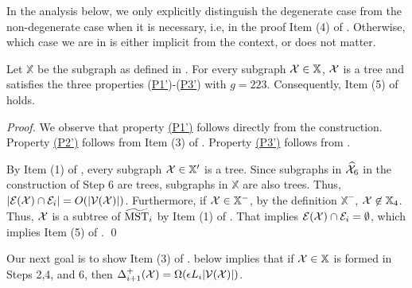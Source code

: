 In the analysis below, we only explicitly  distinguish the degenerate case from the non-degenerate case when it is necessary, i.e, in the proof Item (4) of . Otherwise, which case we are in is either implicit from the context, or does not matter.

\begin{lemma}\label{lm:XProp} Let $\mathbb{X}$ be the subgraph as defined in . For every subgraph $\mathcal{X} \in \mathbb{X}$, $\mathcal{X}$ is a tree and satisfies the three properties (\hyperlink{P1'}{P1'})-(\hyperlink{P3'}{P3'}) with $g = 223$. Consequently, Item (5) of  holds.
\end{lemma}
\begin{proof} We observe that property \hyperlink{P1'}{(P1')} follows directly from the construction.  Property \hyperlink{P2'}{(P2')} follows from Item (3) of .  Property \hyperlink{P3'}{(P3')} follows from . 
	
	By Item (1) of , every subgraph $\mathcal{X} \in \mathbb{X}'$ is a tree. Since subgraphs in $\widehat{\mathcal{X}}_6$ in the construction of Step 6 are trees, subgraphs in $\mathbb{X}$ are also trees. Thus, $|\mathcal{E}(\mathcal{X}) \cap \mathcal{E}_i|  = O(|\mathcal{V}(\mathcal{X})|)$. Furthermore, if $\mathcal{X} \in \mathbb{X}^{-}$, by the definition $\mathbb{X}^{-}$, $\mathcal{X} \not\in \mathbb{X}_4$. Thus, $\mathcal{X}$ is a subtree of $\widetilde{\mathrm{MST}}_{i}$ by Item (1) of . That implies $\mathcal{E}(\mathcal{X})\cap \mathcal{E}_i =  \emptyset$,  which implies Item (5) of . \qed
\end{proof}

Our next goal is to show Item (3) of .  below  implies that if $\mathcal{X} \in \mathbb{X}$ is formed in Steps 2,4, and 6, then $\Delta^+_{i+1}(\mathcal{X}) = \Omega(\epsilon L_i |\mathcal{V}(\mathcal{X})|)$.  


